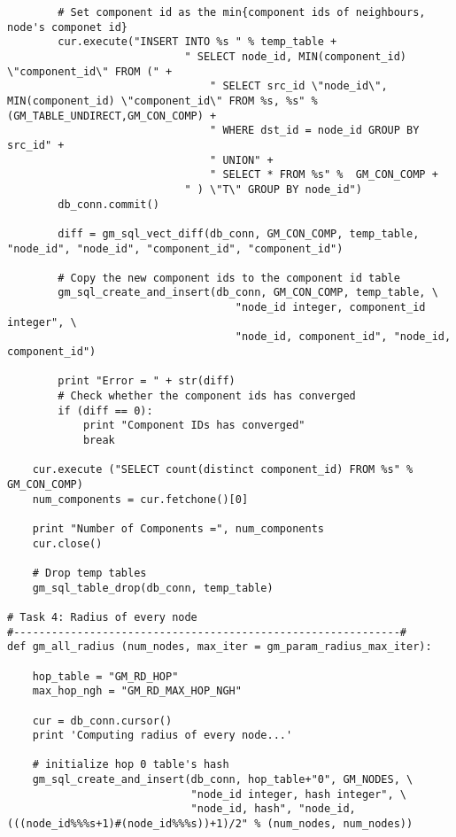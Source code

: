 \documentclass[11pt]{article}
\begin{document}
\begin{lstlisting}
        # Set component id as the min{component ids of neighbours, node's componet id}
        cur.execute("INSERT INTO %s " % temp_table + 
                            " SELECT node_id, MIN(component_id) \"component_id\" FROM (" +
                                " SELECT src_id \"node_id\", MIN(component_id) \"component_id\" FROM %s, %s" % (GM_TABLE_UNDIRECT,GM_CON_COMP) + 
                                " WHERE dst_id = node_id GROUP BY src_id" + 
                                " UNION" +
                                " SELECT * FROM %s" %  GM_CON_COMP +
                            " ) \"T\" GROUP BY node_id")
        db_conn.commit()
        
        diff = gm_sql_vect_diff(db_conn, GM_CON_COMP, temp_table, "node_id", "node_id", "component_id", "component_id")
        
        # Copy the new component ids to the component id table
        gm_sql_create_and_insert(db_conn, GM_CON_COMP, temp_table, \
                                    "node_id integer, component_id integer", \
                                    "node_id, component_id", "node_id, component_id")
                                    
        print "Error = " + str(diff)
        # Check whether the component ids has converged
        if (diff == 0):
            print "Component IDs has converged"
            break
    
    cur.execute ("SELECT count(distinct component_id) FROM %s" % GM_CON_COMP)
    num_components = cur.fetchone()[0]
    
    print "Number of Components =", num_components    
    cur.close()
    
    # Drop temp tables
    gm_sql_table_drop(db_conn, temp_table)
    
# Task 4: Radius of every node
#-------------------------------------------------------------#
def gm_all_radius (num_nodes, max_iter = gm_param_radius_max_iter):
    
    hop_table = "GM_RD_HOP"
    max_hop_ngh = "GM_RD_MAX_HOP_NGH"
    
    cur = db_conn.cursor()
    print 'Computing radius of every node...'    
    
    # initialize hop 0 table's hash     
    gm_sql_create_and_insert(db_conn, hop_table+"0", GM_NODES, \
                             "node_id integer, hash integer", \
                             "node_id, hash", "node_id, (((node_id%%%s+1)#(node_id%%%s))+1)/2" % (num_nodes, num_nodes))
                               

\end{lstlisting}
\end{document}
